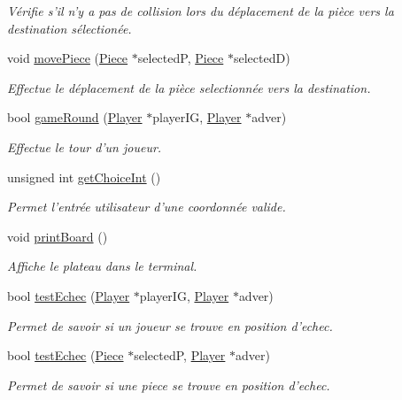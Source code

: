 \begin{DoxyCompactItemize}
\begin{DoxyCompactList}\small\item\em Vérifie s'il n'y a pas de collision lors du déplacement de la pièce vers la destination sélectionée. \end{DoxyCompactList}\item 
void \hyperlink{class_chess_aec36eadf1a550d2f6c85ec8a23bac2d1}{move\-Piece} (\hyperlink{class_piece}{Piece} $\ast$selected\-P, \hyperlink{class_piece}{Piece} $\ast$selected\-D)
\begin{DoxyCompactList}\small\item\em Effectue le déplacement de la pièce selectionnée vers la destination. \end{DoxyCompactList}\item 
bool \hyperlink{class_chess_ac521e181e266322da1664977b102afc5}{game\-Round} (\hyperlink{class_player}{Player} $\ast$player\-I\-G, \hyperlink{class_player}{Player} $\ast$adver)
\begin{DoxyCompactList}\small\item\em Effectue le tour d'un joueur. \end{DoxyCompactList}\item 
unsigned int \hyperlink{class_chess_a7d4dbb556159e245fe753d5a6daada8b}{get\-Choice\-Int} ()
\begin{DoxyCompactList}\small\item\em Permet l'entrée utilisateur d'une coordonnée valide. \end{DoxyCompactList}\item 
void \hyperlink{class_chess_a9cd677e16f4c08ddcdad57a4e12be99f}{print\-Board} ()
\begin{DoxyCompactList}\small\item\em Affiche le plateau dans le terminal. \end{DoxyCompactList}\item 
bool \hyperlink{class_chess_aae6464a0576a72f63aab8450b18dd580}{test\-Echec} (\hyperlink{class_player}{Player} $\ast$player\-I\-G, \hyperlink{class_player}{Player} $\ast$adver)
\begin{DoxyCompactList}\small\item\em Permet de savoir si un joueur se trouve en position d'echec. \end{DoxyCompactList}\item 
bool \hyperlink{class_chess_a1b5cf39c4f616e5e79bd16d4837bc2dc}{test\-Echec} (\hyperlink{class_piece}{Piece} $\ast$selected\-P, \hyperlink{class_player}{Player} $\ast$adver)
\begin{DoxyCompactList}\small\item\em Permet de savoir si une piece se trouve en position d'echec. \end{DoxyCompactList}\item 

\end{DoxyCompactItemize}
